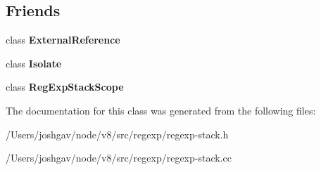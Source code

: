 \subsection*{Friends}
\begin{DoxyCompactItemize}
\item 
class {\bfseries External\+Reference}\hypertarget{classv8_1_1internal_1_1_reg_exp_stack_a6cad52a007e84a78f169131b667e2d49}{}\label{classv8_1_1internal_1_1_reg_exp_stack_a6cad52a007e84a78f169131b667e2d49}

\item 
class {\bfseries Isolate}\hypertarget{classv8_1_1internal_1_1_reg_exp_stack_aba4f0964bdacf2bbf62cf876e5d28d0a}{}\label{classv8_1_1internal_1_1_reg_exp_stack_aba4f0964bdacf2bbf62cf876e5d28d0a}

\item 
class {\bfseries Reg\+Exp\+Stack\+Scope}\hypertarget{classv8_1_1internal_1_1_reg_exp_stack_af3a599fb70f578aa7d436828690530b8}{}\label{classv8_1_1internal_1_1_reg_exp_stack_af3a599fb70f578aa7d436828690530b8}

\end{DoxyCompactItemize}


The documentation for this class was generated from the following files\+:\begin{DoxyCompactItemize}
\item 
/\+Users/joshgav/node/v8/src/regexp/regexp-\/stack.\+h\item 
/\+Users/joshgav/node/v8/src/regexp/regexp-\/stack.\+cc\end{DoxyCompactItemize}
